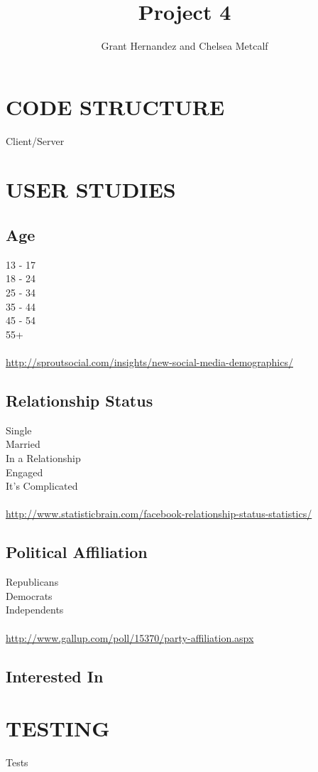 \documentclass{article}
\begin{document}
\title{Project 4}
 
\author{Grant Hernandez and Chelsea Metcalf}
 
\maketitle %
 
\section{CODE STRUCTURE}
Client/Server

\section{USER STUDIES}
\subsection{Age}
13 - 17		 \\
18 - 24		 \\
25 - 34		 \\
35 - 44		 \\
45 - 54		 \\
55+			 \\
\\
\url{http://sproutsocial.com/insights/new-social-media-demographics/}

\subsection{Relationship Status}
Single			 \\
Married			 \\
In a Relationship	 \\
Engaged			 \\
It's Complicated	 \\
\\
\url{http://www.statisticbrain.com/facebook-relationship-status-statistics/}

\subsection{Political Affiliation}
Republicans			 \\
Democrats			 \\
Independents			 \\
\\
\url{http://www.gallup.com/poll/15370/party-affiliation.aspx}

\subsection{Interested In}


\section{TESTING}
Tests
\end{document}
